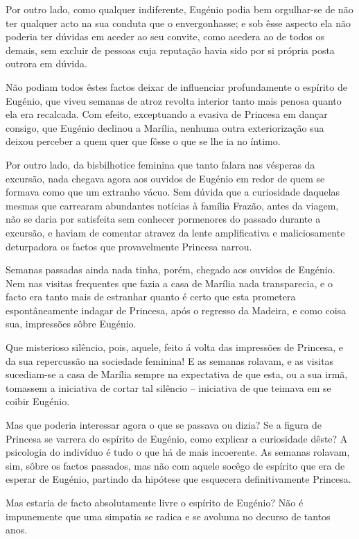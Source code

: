 \documentclass[9pt]{article}
\begin{document}
Por outro lado, como qualquer indiferente, Eugé\-nio podia bem orgu\-lhar-se
de não ter qualquer acto na sua conduta que o envergonhasse; e sob êsse aspecto ela não poderia ter dúvidas em aceder ao seu convite, como acedera ao de
todos os demais, sem excluir de pessoas cuja reputa\-ção havia sido por si própria posta outrora em dúvida.

Não podiam todos êstes factos deixar de influenciar profundamente o espírito de Eugé\-nio, que viveu semanas de atroz revolta interior tanto mais penosa quanto ela era recalcada. Com efeito, exceptuando a evasiva de Princesa
em dan\-çar consigo, que Eugé\-nio declinou a Marília, nenhuma outra exterioriza\-ção sua deixou perceber a quem quer que fôsse o que se lhe ia no íntimo.

Por outro lado, da bisbi\-lhotice feminina que tanto falara nas vésperas
da excursão, nada chegava agora aos ouvidos de Eugé\-nio em redor de quem se formava como que um extranho vácuo. Sem dúvida que a cu\-rio\-sidade daquelas mesmas que carrearam abundantes notícias à fa\-mí\-lia Frazão, antes da viagem,
não se daria por satisfeita sem conhecer pormenores do passado durante a excursão, e haviam de comentar atravez da lente amplifi\-cativa e maliciosamente
deturpadora os factos que provavelmente Princesa narrou.

Semanas passadas ainda nada tinha, porém, chegado aos ouvidos de Eugé\-nio.
Nem nas visitas frequentes que fazia a casa de Marília nada transparecia, e o
facto era tanto mais de estranhar quanto é certo que esta prometera espontâneamente indagar de Princesa, após o regresso da Madeira, e como coisa sua, im\-pres\-sões sôbre Eugé\-nio.

Que misterioso silêncio, pois, aquele, feito á volta das im\-pres\-sões de
Princesa, e da sua repercussão na sociedade feminina! E as semanas rolavam,
e as visitas sucediam-se a casa de Marília sempre na expectativa de que esta,
ou a sua irmã, tomassem a iniciativa de cortar tal silêncio -- iniciativa de
que teimava em se coibir Eugé\-nio.

Mas que poderia interessar agora o que se passava ou dizia? Se a figura
de Princesa se varrera do espírito de Eugé\-nio, como explicar a curiosidade
dêste? A psicologia do indivíduo é tudo o que há de mais incoerente. As semanas rolavam, sim, sôbre os factos passados, mas não com aquele socêgo de espírito que era de esperar de Eugé\-nio, partindo da hipótese que esque\-cera definitivamente Princesa.

Mas estaria de facto absolutamente livre o espírito de Eugé\-nio? Não
é impunemente que uma simpatia se radica e se avoluma no decurso de tantos
anos.
\end{document}
